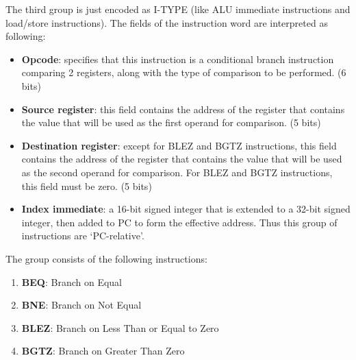 \documentclass[]{scrartcl}
\begin{document}
\begin{itemize}
The third group is just encoded as I-TYPE (like ALU immediate
instructions and load/store instructions). The fields of the instruction
word are interpreted as following:

\begin{itemize}

\item \textbf{Opcode}: specifies that this instruction is a conditional
                       branch instruction comparing 2 registers, along
                       with the type of comparison to be performed. (6 bits)

\item \textbf{Source register}: this field contains the address of the
                                register that contains the value
                                that will be used as the first operand
                                for comparison. (5 bits)

\item \textbf{Destination register}: except for BLEZ and BGTZ instructions,
                                     this field contains the address of the
                                     register that contains the value that
                                     will be used as the second operand
                                     for comparison. For BLEZ and BGTZ
                                     instructions, this field must be
                                     zero. (5 bits)

\item \textbf{Index immediate}: a 16-bit signed integer that is extended
                                to a 32-bit signed integer, then added
                                to PC to form the effective address. Thus
                                this group of instructions are `PC-relative'.

\end{itemize}

The group consists of the following instructions:

\begin{enumerate}

\item \textbf{BEQ}:  Branch on Equal
\item \textbf{BNE}:  Branch on Not Equal
\item \textbf{BLEZ}: Branch on Less Than or Equal to Zero
\item \textbf{BGTZ}: Branch on Greater Than Zero

\end{enumerate}


\end{itemize}
\end{document}
